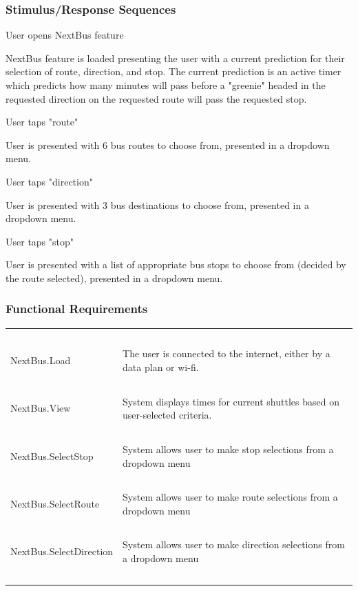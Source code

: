 \documentclass[pdftex,12pt,letter]{article}
\begin{document}
\subsubsection{Stimulus/Response Sequences}
\begin{description}\itemsep1pt
\item[Stimulus:] User opens NextBus feature
\item[Response:] NextBus feature is loaded presenting the user with a current prediction for their selection of route, direction, and stop. The current prediction is an active timer which predicts how many minutes will pass before a "greenie" headed in the requested direction on the requested route will pass the requested stop.
\item[Stimulus:] User taps "route"
\item[Response:] User is presented with 6 bus routes to choose from, presented in a dropdown menu.
\item[Stimulus:] User taps "direction"
\item[Response:] User is presented with 3 bus destinations to choose from, presented in a dropdown menu.
\item[Stimulus:] User taps "stop"
\item[Response:] User is presented with a list of appropriate bus stops to choose from (decided by the route selected), presented in a dropdown menu.
\end{description}
\newpage
\subsubsection{Functional Requirements}
\begin{table}[!h]
\begin{tabularx}{\textwidth }[t]{|l Y|}
\hline
~&~\\
NextBus.Load &  The user is connected to the internet, either by a data plan or wi-fi.\\
~&~\\
NextBus.View & System displays times for current shuttles based on user-selected criteria.\\
~&~\\
NextBus.SelectStop & System allows user to make stop selections from a dropdown menu \\
~&~\\
NextBus.SelectRoute & System allows user to make route selections from a dropdown menu \\
~&~\\
NextBus.SelectDirection & System allows user to make direction selections from a dropdown menu \\
~&~\\
\hline
\end{tabularx}
\end{table}
\FloatBarrier
\end{document}
